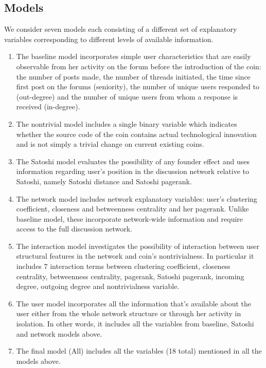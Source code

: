 
\subsection{Models} \label{models}
We consider seven models each consisting of a different set of explanatory variables corresponding to different levels of available information.
\begin{enumerate}[topsep=0pt,itemsep=-0.5ex,partopsep=1ex,parsep=1ex]
 \item The baseline model incorporates simple user characteristics that are easily observable from her activity on the forum before the introduction of the coin: the number of posts made, the number of threads initiated, the time since first post on the forums (seniority), the number of unique users responded to (out-degree) and the number of unique users from whom a response is received (in-degree).
 \item The nontrivial model includes a single binary variable which indicates whether the source code of the coin contains actual technological innovation and is not simply a trivial change on current existing coins.
 \item The Satoshi model evaluates the possibility of any founder effect and uses information regarding user's position in the discussion network relative to Satoshi, namely Satoshi distance and Satoshi pagerank.
 \item The network model includes network explanatory variables: user's clustering coefficient, closeness and betweenness centrality and her pagerank. Unlike baseline model, these incorporate network-wide information and require access to the full discussion network.
 \item The interaction model investigates the possibility of interaction between user structural features in the network and coin's nontrivialness. In particular it includes 7 interaction terms between clustering coefficient, closeness centrality, betweenness centrality, pagerank, Satoshi pagerank, incoming degree, outgoing degree and nontrivialness variable.
 \item The user model incorporates all the information that's available about the user either from the whole network structure or through her activity in isolation. In other words, it includes all the variables from baseline, Satoshi and network models above.
 \item The final model (All) includes all the variables (18 total) mentioned in all the models above.
\end{enumerate}


